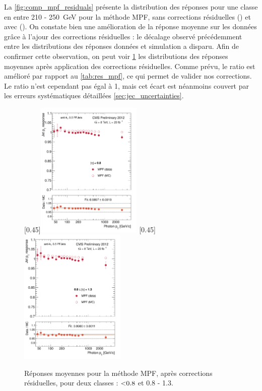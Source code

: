 La \cref{fig:comp_mpf_residuals} présente la distribution des réponses pour une classe en \ptg entre 210 - \SI{250}{\GeV} pour la méthode MPF, sans corrections résiduelles () et avec (). On constate bien une amélioration de la réponse moyenne sur les données grâce à l'ajour des corrections résiduelles : le décalage observé précédemment entre les distributions des réponses données et simulation a disparu. Afin de confirmer cette observation, on peut voir \cref{fig:comp_mpf_residuals_2} les distributions des réponses moyennes après application des corrections résiduelles. Comme prévu, le ratio est amélioré par rapport au \cref{tab:res_mpf}, ce qui permet de valider nos corrections. Le ratio n'est cependant pas égal à 1, mais cet écart est néanmoins couvert par les erreurs systématiques détaillées \cref{sec:jec_uncertainties}.

\begin{figure}[tbp]
    \centering
    \subcaptionbox{\label{fig:resp_mpf_residuals_eta008}}[0.45\textwidth]{\includegraphics[width=0.45\textwidth]{chapitre4/figs/resp_mpf_residuals/response_eta008_mpf.pdf}} \qquad
    \subcaptionbox{\label{fig:resp_mpf_residuals_eta0813}}[0.45\textwidth]{\includegraphics[width=0.45\textwidth]{chapitre4/figs/resp_mpf_residuals/response_eta0813_mpf.pdf}}
    \caption{Réponses moyennes pour la méthode MPF, après corrections résiduelles, pour deux classes \aeta : $\num{< 0.8}$ et \num{0.8} - \num{1.3}.}
    \label{fig:comp_mpf_residuals_2}
\end{figure}

